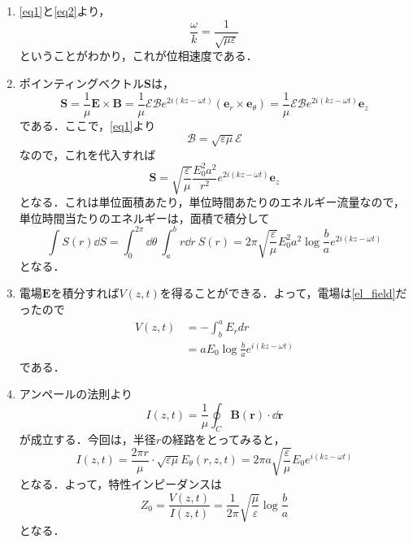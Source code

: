 \documentclass[a4paper,pdflatex,ja=standard]{bxjsarticle}
\begin{document}
\begin{enumerate}
  \item 
  \eqref{eq1}と\eqref{eq2}より，
  \begin{equation}
    \frac{\omega}{k}
    =
    \frac{1}{\sqrt{\mu\varepsilon}}
  \end{equation}
  ということがわかり，これが位相速度である．

  \item 
  ポインティングベクトル$\bm{S}$は，
  \begin{equation}
    \bm{S}
    =
    \frac{1}{\mu}\bm{E}\times\bm{B}
    =
    \frac{1}{\mu}\mathcal{E}\mathcal{B}e^{2i(kz-\omega t)}(\bm{e}_{r}\times\bm{e}_{\theta})
    =
    \frac{1}{\mu}\mathcal{E}\mathcal{B}e^{2i(kz-\omega t)}\bm{e}_{z}
  \end{equation}
  である．ここで，\eqref{eq1}より
  \begin{equation}
    \mathcal{B}
    =
    \sqrt{\varepsilon\mu}\mathcal{E}
  \end{equation}
  なので，これを代入すれば
  \begin{equation}
    \bm{S}
    =
    \sqrt{\frac{\varepsilon}{\mu}}\frac{E_{0}^2 a^2}{r^2}e^{2i(kz-\omega t)}\bm{e}_{z}
  \end{equation}
  となる．これは単位面積あたり，単位時間あたりのエネルギー流量なので，単位時間当たりのエネルギーは，面積で積分して
  \begin{equation}
    \int S(r)\dd S
    =
    \int_{0}^{2\pi}\dd \theta\ \int_{a}^{b}r \dd r\ S(r)
    =
    2\pi
    \sqrt{\frac{\varepsilon}{\mu}}E_{0}^2 a^2 \log\frac{b}{a} e^{2i(kz-\omega t)}
  \end{equation}
  となる．

  \item 
  電場$\bm{E}$を積分すれば$V(z,t)$を得ることができる．よって，電場は\eqref{el_field}だったので
  \begin{align}
    V(z,t)
    &=
    -\int_{b}^{a} E_{r} dr
    \nonumber
    \\
    &=
    a E_{0}\log\frac{b}{a}e^{i(kz-\omega t)}
  \end{align}
  である．

  \item 
  アンペールの法則より
  \begin{equation}
    I(z,t)
    =
    \frac{1}{\mu}\oint_{C}\bm{B}(\bm{r})\cdot\dd \bm{r}
  \end{equation}
  が成立する．今回は，半径$r$の経路をとってみると，
  \begin{equation}
    I(z,t)
    =
    \frac{2\pi r}{\mu}\cdot \sqrt{\varepsilon\mu}E_{\theta}(r,z,t)
    =
    2\pi a\sqrt{\frac{\varepsilon}{\mu}}E_{0}e^{i(kz-\omega t)}
  \end{equation}
  となる．よって，特性インピーダンスは
  \begin{equation}
    Z_{0}
    =
    \frac{V(z,t)}{I(z,t)}
    =
    \frac{1}{2\pi}\sqrt{\frac{\mu}{\varepsilon}}\log\frac{b}{a}
  \end{equation}
  となる．


\end{enumerate}
\end{document}
